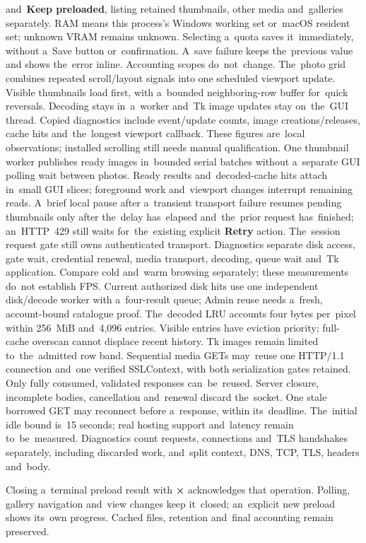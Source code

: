 \documentclass[11pt,a4paper]{article}
\newcommand{\ui}[1]{\textbf{#1}}
\begin{document}
and~\ui{Keep preloaded}, listing retained thumbnails, other media and~galleries
separately. RAM means this process's Windows working set or~macOS resident set;
unknown VRAM remains unknown. Selecting a~quota saves it~immediately, without
a~Save button or~confirmation. A~save failure keeps the~previous value and
shows the~error inline. Accounting scopes do~not~change.
The~photo grid combines repeated scroll/layout signals into one scheduled
viewport update. Visible thumbnails load first, with a~bounded neighboring-row
buffer for~quick reversals. Decoding stays in~a~worker and~Tk image updates
stay on~the~GUI thread. Copied diagnostics include event/update counts, image
creations/releases, cache hits and~the~longest viewport callback. These figures
are~local observations; installed scrolling still needs manual qualification.
One thumbnail worker publishes ready images in~bounded serial batches without
a~separate GUI polling wait between photos. Ready results and~decoded-cache
hits attach in~small GUI slices; foreground work and~viewport changes interrupt
remaining reads. A~brief local pause after a~transient transport failure resumes
pending thumbnails only after the~delay has~elapsed and~the~prior request
has~finished; an~HTTP~429 still waits for~the~existing explicit \ui{Retry} action.
The~session request gate
still owns authenticated transport.
Diagnostics separate disk access, gate wait, credential renewal, media
transport, decoding, queue wait and~Tk application. Compare cold and~warm
browsing separately; these measurements do~not establish FPS.
Current authorized disk hits use one independent disk/decode worker with
a~four-result queue; Admin reuse needs a~fresh, account-bound catalogue proof.
The~decoded LRU accounts four bytes per~pixel within 256~MiB and~4,096 entries.
Visible entries have eviction priority; full-cache overscan cannot displace
recent history. Tk images remain limited to~the~admitted row band.
Sequential media GETs may~reuse one HTTP/1.1 connection and~one verified
SSLContext, with both serialization gates retained. Only fully consumed,
validated responses can~be~reused. Server closure, incomplete bodies,
cancellation and~renewal discard the~socket. One stale borrowed GET may
reconnect before a~response, within its~deadline. The~initial idle bound
is~15 seconds; real hosting support and~latency remain to~be~measured.
Diagnostics count requests, connections and~TLS handshakes separately,
including discarded work, and~split context, DNS, TCP, TLS, headers and~body.

Closing a~terminal preload result with \ui{×} acknowledges that operation.
Polling, gallery navigation and~view changes keep it~closed; an~explicit new
preload shows its~own progress. Cached files, retention and~final accounting
remain preserved.
\end{document}
